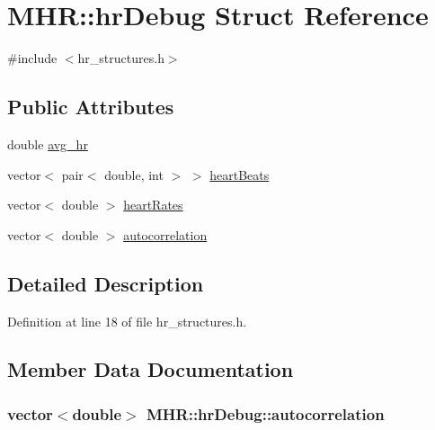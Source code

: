 \hypertarget{struct_m_h_r_1_1hr_debug}{\section{M\+H\+R\+:\+:hr\+Debug Struct Reference}
\label{struct_m_h_r_1_1hr_debug}
}


{\ttfamily \#include $<$hr\+\_\+structures.\+h$>$}

\subsection*{Public Attributes}
\begin{DoxyCompactItemize}
\item 
double \hyperlink{struct_m_h_r_1_1hr_debug_ab0a19a437cbd96f0af5d1b41114c1b80}{avg\+\_\+hr}
\item 
vector$<$ pair$<$ double, int $>$ $>$ \hyperlink{struct_m_h_r_1_1hr_debug_aecd197b08db2c97469bc1d99af93a559}{heart\+Beats}
\item 
vector$<$ double $>$ \hyperlink{struct_m_h_r_1_1hr_debug_a019b377c2e1d3ade917074967cf20504}{heart\+Rates}
\item 
vector$<$ double $>$ \hyperlink{struct_m_h_r_1_1hr_debug_a6222c0c8c70a697d9d312e238933952b}{autocorrelation}
\end{DoxyCompactItemize}


\subsection{Detailed Description}


Definition at line 18 of file hr\+\_\+structures.\+h.



\subsection{Member Data Documentation}
\hypertarget{struct_m_h_r_1_1hr_debug_a6222c0c8c70a697d9d312e238933952b}{
\subsubsection[{autocorrelation}]{\setlength{\rightskip}{0pt plus 5cm}vector$<$double$>$ M\+H\+R\+::hr\+Debug\+::autocorrelation}}\label{struct_m_h_r_1_1hr_debug_a6222c0c8c70a697d9d312e238933952b}


